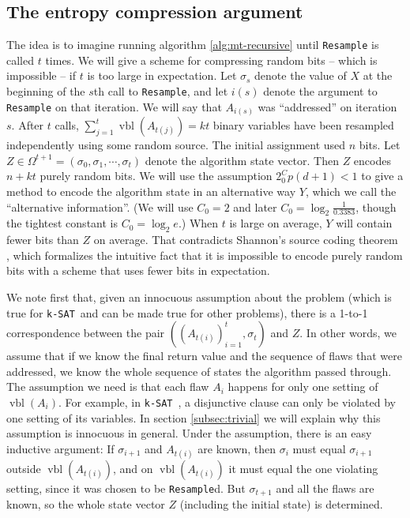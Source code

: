 \documentclass{article}
\newcommand{\ksat}{\texttt{k-SAT}~}
\begin{document}
\subsection{The entropy compression argument}
The idea is to imagine running algorithm \ref{alg:mt-recursive} until \texttt{Resample} is called $t$ times.  We will give a scheme for compressing random bits -- which is impossible -- if $t$ is too large in expectation.  Let $\sigma_s$ denote the value of $X$ at the beginning of the $s$th call to \texttt{Resample}, and let $i(s)$ denote the argument to \texttt{Resample} on that iteration.  We will say that $A_{i(s)}$ was ``addressed'' on iteration $s$.  After $t$ calls, $\sum_{j = 1}^{t} \operatorname{vbl}(A_{t(j)}) = k t$ binary variables have been resampled independently using some random source.  The initial assignment used $n$ bits.  Let $Z \in \Omega^{t+1} = (\sigma_0, \sigma_1, \cdots, \sigma_t)$ denote the algorithm state vector.  Then $Z$ encodes $n + k t$ purely random bits.  We will use the assumption $2^C_0 p (d+1) < 1$ to give a method to encode the algorithm state in an alternative way $Y$, which we call the ``alternative information''.  (We will use $C_0 = 2$ and later $C_0 = \log_2 \frac{1}{0.3383}$, though the tightest constant is $C_0 = \log_2 e$.)  When $t$ is large on average, $Y$ will contain fewer bits than $Z$ on average.  That contradicts Shannon's source coding theorem \cite{shannon2001mathematical}, which formalizes the intuitive fact that it is impossible to encode purely random bits with a scheme that uses fewer bits in expectation.

We note first that, given an innocuous assumption about the problem (which is true for \ksat and can be made true for other problems), there is a 1-to-1 correspondence between the pair $((A_{t(i)})_{i=1}^{t}, \sigma_{t})$ and $Z$.  In other words, we assume that if we know the final return value and the sequence of flaws that were addressed, we know the whole sequence of states the algorithm passed through.  The assumption we need is that each flaw $A_i$ happens for only one setting of $\operatorname{vbl}(A_i)$.  For example, in \ksat, a disjunctive clause can only be violated by one setting of its variables.  In section \ref{subsec:trivial} we will explain why this assumption is innocuous in general.  Under the assumption, there is an easy inductive argument: If $\sigma_{i+1}$ and $A_{t(i)}$ are known, then $\sigma_i$ must equal $\sigma_{i+1}$ outside $\operatorname{vbl}(A_{t(i)})$, and on $\operatorname{vbl}(A_{t(i)})$ it must equal the one violating setting, since it was chosen to be \texttt{Resample}d.  But $\sigma_{t+1}$ and all the flaws are known, so the whole state vector $Z$ (including the initial state) is determined.
\end{document}
